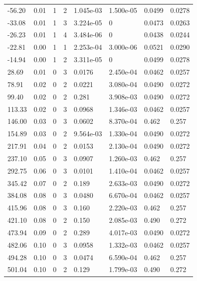 \documentclass[preview]{standalone}
\begin{document}
{{\begin{tabular}{L{1.2cm}C{1.2cm} C{0.3cm}C{0.5cm} C{1.4cm}C{1.4cm} C{1.4cm}C{1.4cm}}
  -56.20  &  0.01  & 1     &  2 &  1.045e-03  & 1.500e-05  & 0.0499 &  0.0278   \\ 
  -33.08  &  0.01  & 1     &  3 &  3.224e-05  & 0  & 0.0473 &  0.0263   \\ 
  -26.23  &  0.01  & 1     &  4 &  3.484e-06  & 0  & 0.0438 &  0.0244   \\ 
  -22.81  &  0.00  & 1     &  1 &  2.253e-04  & 3.000e-06  & 0.0521 &  0.0290   \\ 
  -14.94  &  0.00  & 1     &  2 &  3.311e-05  & 0  & 0.0499 &  0.0278   \\ 
  28.69  &  0.01  & 0     &  3 &  0.0176  & 2.450e-04  & 0.0462 &  0.0257   \\ 
  78.91  &  0.02  & 0     &  2 &  0.0221  & 3.080e-04  & 0.0490 &  0.0272   \\ 
  99.40  &  0.02  & 0     &  2 &  0.281  & 3.908e-03  & 0.0490 &  0.0272   \\ 
  113.33  &  0.02  & 0     &  3 &  0.0968  & 1.346e-03  & 0.0462 &  0.0257   \\ 
  146.00  &  0.03  & 0     &  3 &  0.0602  & 8.370e-04  & 0.462 &  0.257   \\ 
  154.89  &  0.03  & 0     &  2 &  9.564e-03  & 1.330e-04  & 0.0490 &  0.0272   \\ 
  217.91  &  0.04  & 0     &  2 &  0.0153  & 2.130e-04  & 0.0490 &  0.0272   \\ 
  237.10  &  0.05  & 0     &  3 &  0.0907  & 1.260e-03  & 0.462 &  0.257   \\ 
  292.75  &  0.06  & 0     &  3 &  0.0101  & 1.410e-04  & 0.0462 &  0.0257   \\ 
  345.42  &  0.07  & 0     &  2 &  0.189  & 2.633e-03  & 0.0490 &  0.0272   \\ 
  384.08  &  0.08  & 0     &  3 &  0.0480  & 6.670e-04  & 0.0462 &  0.0257   \\ 
  415.96  &  0.08  & 0     &  3 &  0.160  & 2.220e-03  & 0.462 &  0.257   \\ 
  421.10  &  0.08  & 0     &  2 &  0.150  & 2.085e-03  & 0.490 &  0.272   \\ 
  473.94  &  0.09  & 0     &  2 &  0.289  & 4.017e-03  & 0.0490 &  0.0272   \\ 
  482.06  &  0.10  & 0     &  3 &  0.0958  & 1.332e-03  & 0.0462 &  0.0257   \\ 
  494.28  &  0.10  & 0     &  3 &  0.0474  & 6.590e-04  & 0.462 &  0.257   \\ 
  501.04  &  0.10  & 0     &  2 &  0.129  & 1.799e-03  & 0.490 &  0.272   \\ 

\end{tabular}}}
\end{document}
